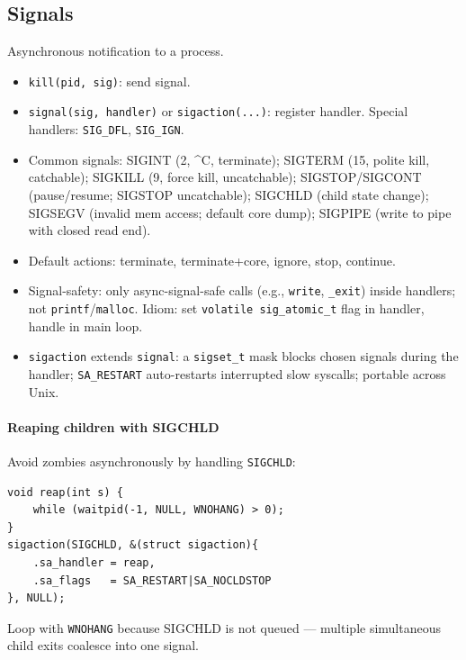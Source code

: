 \subsection{Signals}
Asynchronous notification to a process.
\begin{itemize}
  \item \texttt{\textcolor{Bittersweet}{kill}(pid, sig)}: send signal.
  \item \texttt{\textcolor{Bittersweet}{signal}(sig, handler)} or \texttt{\textcolor{Bittersweet}{sigaction}(...)}: register handler. Special handlers: \texttt{SIG\_DFL}, \texttt{SIG\_IGN}.
  \item \textcolor{Bittersweet}{Common signals}: SIGINT (2, \^{}C, terminate); SIGTERM (15, polite kill, catchable); SIGKILL (9, force kill, uncatchable); SIGSTOP/SIGCONT (pause/resume; SIGSTOP uncatchable); SIGCHLD (child state change); SIGSEGV (invalid mem access; default core dump); SIGPIPE (write to pipe with closed read end).
  \item \textcolor{Bittersweet}{Default actions}: terminate, terminate+core, ignore, stop, continue.
  \item \textcolor{Bittersweet}{Signal-safety}: only async-signal-safe calls (e.g., \texttt{write}, \texttt{\_exit}) inside handlers; not \texttt{printf}/\texttt{malloc}. Idiom: set \texttt{volatile sig\_atomic\_t} flag in handler, handle in main loop.
  \item \texttt{sigaction} extends \texttt{signal}: a \texttt{sigset\_t} mask blocks chosen signals during the handler; \texttt{SA\_RESTART} auto-restarts interrupted slow syscalls; portable across Unix.
\end{itemize}

\paragraph{Reaping children with SIGCHLD}
Avoid zombies asynchronously by handling \texttt{SIGCHLD}:
\begin{verbatim}
void reap(int s) {
    while (waitpid(-1, NULL, WNOHANG) > 0);
}
sigaction(SIGCHLD, &(struct sigaction){
    .sa_handler = reap,
    .sa_flags   = SA_RESTART|SA_NOCLDSTOP
}, NULL);
\end{verbatim}
Loop with \texttt{WNOHANG} because SIGCHLD is not queued — multiple simultaneous child exits coalesce into one signal.

